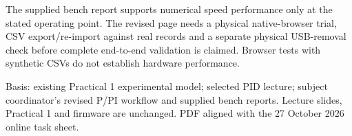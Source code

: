 \documentclass[10pt,a4paper]{article}
\newcommand{\sub}[1]{\par\vspace{3pt}{\bfseries #1}\par\vspace{1pt}}
\begin{document}
\sub{Instructor release status}
{\fontsize{9}{11}\selectfont
The supplied bench report supports numerical speed performance only at the stated operating point. The revised page needs a physical native-browser trial, CSV export/re-import against real records and a separate physical USB-removal check before complete end-to-end validation is claimed. Browser tests with synthetic CSVs do not establish hardware performance.

Basis: existing Practical 1 experimental model; selected PID lecture; subject coordinator's revised P/PI workflow and supplied bench reports. Lecture slides, Practical 1 and firmware are unchanged. PDF aligned with the 27 October 2026 online task sheet.\par}
\end{document}
